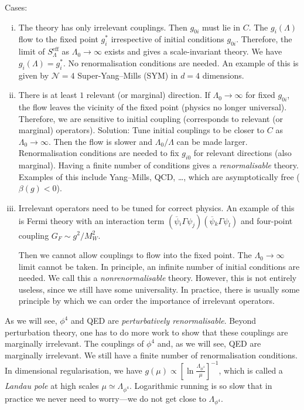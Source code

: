 Cases:
\begin{enumerate}[(i)]
  \item The theory has only irrelevant couplings.
    Then $g_{0 i}$ must lie in $C$.
    The $g_i(\Lambda)$ flow to the fixed point $g_i^*$ irrespective of initial conditions $g_{0 i}$.
    Therefore, the limit of $S_\Lambda^{\text{eff}}$ as $\Lambda_0 \to \infty$ exists and gives a scale-invariant theory.
    We have $g_i(\Lambda) = g^*_i$.
    No renormalisation conditions are needed.
    An example of this is given by $\mathcal{N} = 4$ Super-Yang--Mills (SYM) in $d = 4$ dimensions.
  \item There is at least $1$ relevant (or marginal) direction.
    If $\Lambda_0 \to \infty$ for fixed $g_{0i}$, the flow leaves the vicinity of the fixed point (physics no longer universal).
    Therefore, we are sensitive to initial coupling (corresponds to relevant (or marginal) operators).
    Solution: Tune initial couplings to be closer to $C$ as $\Lambda_0 \to \infty$.
    Then the flow is slower and $\Lambda_0 / \Lambda$ can be made larger.
    Renormalisation conditions are needed to fix $g_{i0}$ for relevant directions (also marginal).
    Having a finite number of conditions gives a \emph{renormalisable} theory.
    Examples of this include Yang--Mills, QCD, \dots, which are asymptotically free ($\beta(g) < 0$).
  \item Irrelevant operators need to be tuned for correct physics.
    An example of this is Fermi theory with an interaction term $(\overline{\psi}{}_i \Gamma \psi_j) (\overline{\psi}{}_k \Gamma \psi_l)$ and four-point coupling $G_F \sim g^2 / M_W^2$.
    
    Then we cannot allow couplings to flow into the fixed point. The $\Lambda_0 \to \infty$ limit cannot be taken.
    In principle, an infinite number of initial conditions are needed.
    We call this a \emph{nonrenormalisable} theory. However, this is not entirely useless, since we still have some universality. In practice, there is usually some principle by which we can order the importance of irrelevant operators.
\end{enumerate}

As we will see, $\phi^4$ and QED are \emph{perturbatively renormalisable}.
Beyond perturbation theory, one has to do more work to show that these couplings are marginally irrelevant.
The couplings of $\phi^4$ and, as we will see, QED are marginally irrelevant. We still have a finite number of renormalisation conditions.
In dimensional regularisation, we have $g(\mu) \propto [\ln \frac{\Lambda_{\phi^4}}{\mu}]^{-1}$, which is called a \emph{Landau pole} at high scales $\mu \simeq \Lambda_{\phi^4}$.
Logarithmic running is so slow that in practice we never need to worry---we do not get close to $\Lambda_{\phi^4}$.

